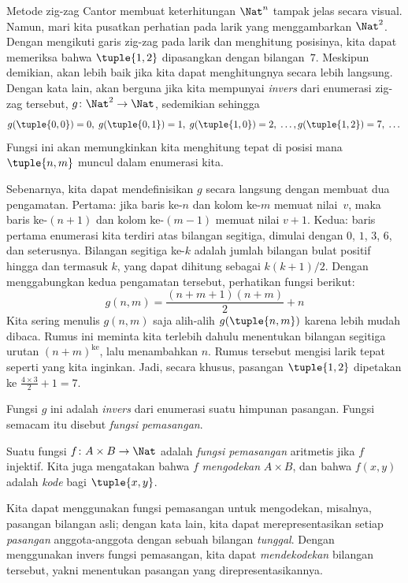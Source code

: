 \documentclass[../../../include/open-logic-section]{subfiles}
\begin{document}

\begin{explain}
Metode zig-zag Cantor membuat keterhitungan $\Nat^n$ tampak jelas secara
visual. Namun, mari kita pusatkan perhatian pada larik yang menggambarkan
$\Nat^2$. Dengan mengikuti garis zig-zag pada larik dan menghitung posisinya,
kita dapat memeriksa bahwa $\tuple{1,2}$ dipasangkan dengan bilangan~$7$.
Meskipun demikian, akan lebih baik jika kita dapat menghitungnya secara lebih
langsung. Dengan kata lain, akan berguna jika kita mempunyai \emph{invers}
dari enumerasi zig-zag tersebut, $g\colon \Nat^2 \to \Nat$, sedemikian sehingga
\[
g(\tuple{0,0}) = 0, \;
g(\tuple{0,1}) = 1, \;
g(\tuple{1,0}) = 2, \; \dots,
g(\tuple{1,2}) = 7, \; \dots
\]
Fungsi ini akan memungkinkan kita menghitung tepat di posisi mana
$\tuple{n, m}$ muncul dalam enumerasi kita.

Sebenarnya, kita dapat mendefinisikan $g$ secara langsung dengan membuat dua
pengamatan. Pertama: jika baris ke-$n$ dan kolom ke-$m$ memuat nilai~$v$,
maka baris ke-$(n+1)$ dan kolom ke-$(m-1)$ memuat nilai $v + 1$. Kedua: baris
pertama enumerasi kita terdiri atas bilangan segitiga, dimulai dengan $0$,
$1$, $3$, $6$, dan seterusnya. Bilangan segitiga ke-$k$ adalah jumlah bilangan
bulat positif hingga dan termasuk $k$, yang dapat dihitung sebagai
$k(k+1)/2$. Dengan
menggabungkan kedua pengamatan tersebut, perhatikan fungsi berikut:
\[
  g(n,m) = \frac{(n+m+1)(n+m)}{2} + n
\]
Kita sering menulis $g(n, m)$ saja alih-alih $g(\tuple{n, m})$ karena lebih
mudah dibaca. Rumus ini meminta kita terlebih dahulu menentukan bilangan
segitiga urutan $(n+m)^\text{ke}$, lalu menambahkan $n$. Rumus tersebut mengisi larik tepat
seperti yang kita inginkan. Jadi, secara khusus, pasangan $\tuple{1, 2}$
dipetakan ke $\frac{4 \times 3}{2} + 1 = 7$.

Fungsi $g$ ini adalah \emph{invers} dari enumerasi suatu himpunan pasangan.
Fungsi semacam itu disebut \emph{fungsi pemasangan}.
\end{explain}

\begin{defn}
  Suatu fungsi $f\colon A \times B \to \Nat$ adalah \emph{fungsi pemasangan}
  aritmetis jika $f$ injektif. Kita juga mengatakan bahwa $f$
  \emph{mengodekan} $A \times B$, dan bahwa $f(x,y)$ adalah \emph{kode} bagi
  $\tuple{x,y}$.
\end{defn}

\begin{explain}
Kita dapat menggunakan fungsi pemasangan untuk mengodekan, misalnya, pasangan
bilangan asli; dengan kata lain, kita dapat merepresentasikan setiap
\emph{pasangan} anggota-anggota dengan sebuah bilangan \emph{tunggal}. Dengan
menggunakan invers fungsi pemasangan, kita dapat \emph{mendekodekan} bilangan
tersebut, yakni menentukan pasangan yang direpresentasikannya.
\end{explain}
\end{document}
